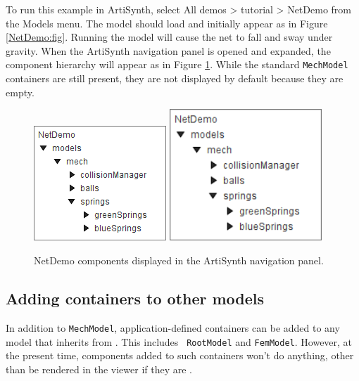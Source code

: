 To run this example in ArtiSynth, select {\sf All demos > tutorial >
NetDemo} from the {\sf Models} menu. The model should load and
initially appear as in Figure \ref{NetDemo:fig}.  Running the model
will cause the net to fall and sway under gravity. When the ArtiSynth
navigation panel is opened and expanded, the component hierarchy will
appear as in Figure \ref{NetDemoNav:fig}. While the standard
{\tt MechModel} containers are still present, they are not displayed
by default because they are empty.

\begin{figure}[ht]
\begin{center}
\iflatexml
 \includegraphics[]{images/NetDemoNav}
\else
 \includegraphics[width=2.25in]{images/NetDemoNav}
\fi
\end{center}
\caption{NetDemo components displayed in the ArtiSynth navigation panel.}
\label{NetDemoNav:fig}
\end{figure}

\subsection{Adding containers to other models}

In addition to {\tt MechModel}, application-defined containers can be
added to any model that inherits from
. This includes {\tt
RootModel} and {\tt FemModel}. However, at the present time,
components added to such containers won't do anything, other than be
rendered in the viewer if they are
.

